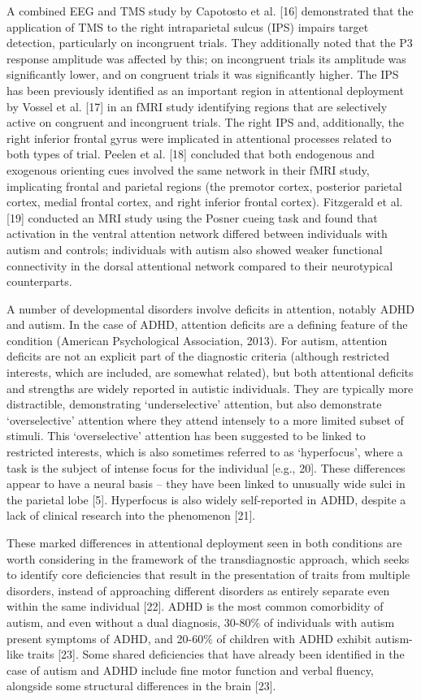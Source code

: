 \documentclass[
  letterpaper,
  DIV=11,
  numbers=noendperiod]{scrartcl}
\begin{document}
A combined EEG and TMS study by Capotosto et al. {[}16{]} demonstrated
that the application of TMS to the right intraparietal sulcus (IPS)
impairs target detection, particularly on incongruent trials. They
additionally noted that the P3 response amplitude was affected by this;
on incongruent trials its amplitude was significantly lower, and on
congruent trials it was significantly higher. The IPS has been
previously identified as an important region in attentional deployment
by Vossel et al. {[}17{]} in an fMRI study identifying regions that are
selectively active on congruent and incongruent trials. The right IPS
and, additionally, the right inferior frontal gyrus were implicated in
attentional processes related to both types of trial. Peelen et al.
{[}18{]} concluded that both endogenous and exogenous orienting cues
involved the same network in their fMRI study, implicating frontal and
parietal regions (the premotor cortex, posterior parietal cortex, medial
frontal cortex, and right inferior frontal cortex). Fitzgerald et al.
{[}19{]} conducted an MRI study using the Posner cueing task and found
that activation in the ventral attention network differed between
individuals with autism and controls; individuals with autism also
showed weaker functional connectivity in the dorsal attentional network
compared to their neurotypical counterparts.

A number of developmental disorders involve deficits in attention,
notably ADHD and autism. In the case of ADHD, attention deficits are a
defining feature of the condition (American Psychological Association,
2013). For autism, attention deficits are not an explicit part of the
diagnostic criteria (although restricted interests, which are included,
are somewhat related), but both attentional deficits and strengths are
widely reported in autistic individuals. They are typically more
distractible, demonstrating `underselective' attention, but also
demonstrate `overselective' attention where they attend intensely to a
more limited subset of stimuli. This `overselective' attention has been
suggested to be linked to restricted interests, which is also sometimes
referred to as `hyperfocus', where a task is the subject of intense
focus for the individual {[}e.g., 20{]}. These differences appear to
have a neural basis -- they have been linked to unusually wide sulci in
the parietal lobe {[}5{]}. Hyperfocus is also widely self-reported in
ADHD, despite a lack of clinical research into the phenomenon {[}21{]}.

These marked differences in attentional deployment seen in both
conditions are worth considering in the framework of the transdiagnostic
approach, which seeks to identify core deficiencies that result in the
presentation of traits from multiple disorders, instead of approaching
different disorders as entirely separate even within the same individual
{[}22{]}. ADHD is the most common comorbidity of autism, and even
without a dual diagnosis, 30-80\% of individuals with autism present
symptoms of ADHD, and 20-60\% of children with ADHD exhibit autism-like
traits {[}23{]}. Some shared deficiencies that have already been
identified in the case of autism and ADHD include fine motor function
and verbal fluency, alongside some structural differences in the brain
{[}23{]}.
\end{document}
